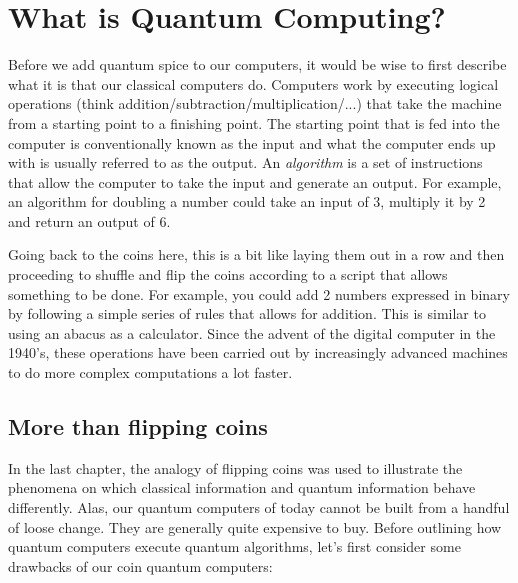 

\chapter{What is Quantum Computing?}

Before we add quantum spice to our computers, it would be wise to first describe what it is that our classical computers do. Computers work by executing logical operations (think addition/subtraction/multiplication/...) that take the machine from a starting point to a finishing point. The starting point that is fed into the computer is conventionally known as the input and what the computer ends up with is usually referred to as the output. An \textit{algorithm} is a set of instructions that allow the computer to take the input and generate an output. For example, an algorithm for doubling a number could take an input of 3, multiply it by 2 and return an output of 6. 

Going back to the coins here, this is a bit like laying them out in a row and then proceeding to shuffle and flip the coins according to a script that allows something to be done. For example, you could add 2 numbers expressed in binary by following a simple series of rules that allows for addition. This is similar to using an abacus as a calculator. Since the advent of the digital computer in the 1940's, these operations have been carried out by increasingly advanced machines to do more complex computations a lot faster.

\section{More than flipping coins} 

In the last chapter, the analogy of flipping coins was used to illustrate the phenomena on which classical information and quantum information behave differently. Alas, our quantum computers of today cannot be built from a handful of loose change. They are generally quite expensive to buy. Before outlining how quantum computers execute quantum algorithms, let's first consider some drawbacks of our coin quantum computers: 


